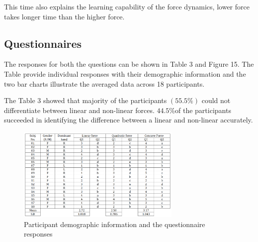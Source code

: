 	This time also explains the learning capability of the force dynamics, lower force takes longer time than the higher force.
	
	\subsection{Questionnaires}
	The responses for both the questions can be shown in Table 3 and Figure 15. The Table provide individual responses with their demographic information and the two bar charts illustrate the averaged data across 18 participants.
	
	The Table 3 showed that majority of the participants $(55.5\%)$ could not differentiate between linear and non-linear forces.  $44.5 \% $of the participants succeeded in identifying the difference between a linear and non-linear accurately.
	\begin{figure}
	\centering
	\includegraphics[width=0.7\textwidth]{Chie/figs/Table3.png}
	\caption{Participant demographic information and the questionnaire responses}
	\label{Table1}
\end{figure}

